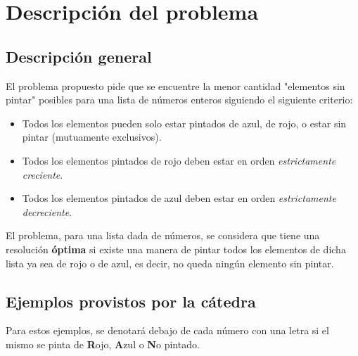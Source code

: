 \section{Descripción del problema}

	\subsection{Descripción general}
	El problema propuesto pide que se encuentre la menor cantidad "elementos sin pintar" posibles para una lista de números enteros siguiendo el siguiente criterio:
	
	\begin{itemize}
		\item Todos los elementos pueden solo estar pintados de azul, de rojo, o estar sin pintar (mutuamente exclusivos).
		\item Todos los elementos pintados de rojo deben estar en orden \textit{estrictamente creciente}.
		\item Todos los elementos pintados de azul deben estar en orden \textit{estrictamente decreciente}.
	\end{itemize}

	El problema, para una lista dada de números, se considera que tiene una resolución \textbf{óptima} si existe una manera de pintar todos los elementos de dicha lista ya sea de rojo o de azul, es decir, no queda ningún elemento sin pintar.

	\subsection{Ejemplos provistos por la cátedra}
	
	Para estos ejemplos, se denotará debajo de cada número con una letra si el mismo se pinta de \textbf{R}ojo, \textbf{A}zul o \textbf{N}o pintado.

